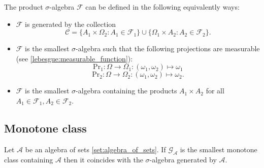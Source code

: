     \begin{definition}\label{set:product_of_sigma_algebras}
        The product $\sigma$-algebra $\mathcal{F}$ can be defined in the following equivalently ways:
        \begin{itemize}
            \item $\mathcal{F}$ is generated by the collection
                \[\mathcal{C} = \{A_1\times \Omega_2:A_1\in\mathcal{F}_1\}\cup\{\Omega_1\times A_2:A_2\in\mathcal{F}_2\}.\]
            \item $\mathcal{F}$ is the smallest $\sigma$-algebra such that the following projections are measurable (see \ref{lebesgue:measurable_function}):
                \[\text{Pr}_1:\Omega\rightarrow\Omega_1:(\omega_1,\omega_2)\mapsto\omega_1\]
                \[\text{Pr}_2:\Omega\rightarrow\Omega_2:(\omega_1,\omega_2)\mapsto\omega_2.\]
            \item $\mathcal{F}$ is the smallest $\sigma$-algebra containing the products $A_1\times A_2$ for all $A_1\in\mathcal{F}_1, A_2\in\mathcal{F}_2$.
        \end{itemize}
    \end{definition}

\subsection{Monotone class}


    \begin{theorem}\label{set:theorem:monotone_class}
        Let $\mathcal{A}$ be an algebra of sets \ref{set:algebra_of_sets}. If $\mathcal{G}_\mathcal{A}$ is the smallest monotone class containing $\mathcal{A}$ then it coincides with the $\sigma$-algebra generated by $\mathcal{A}$.
    \end{theorem}

